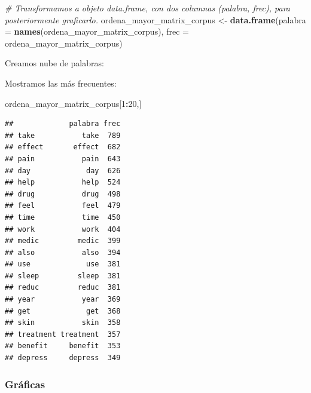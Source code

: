 \documentclass[spanish,]{article}
\newenvironment{Shaded}{\begin{snugshade}}{\end{snugshade}}
\newcommand{\KeywordTok}[1]{\textcolor[rgb]{0.13,0.29,0.53}{\textbf{#1}}}
\newcommand{\DataTypeTok}[1]{\textcolor[rgb]{0.13,0.29,0.53}{#1}}
\newcommand{\DecValTok}[1]{\textcolor[rgb]{0.00,0.00,0.81}{#1}}
\newcommand{\StringTok}[1]{\textcolor[rgb]{0.31,0.60,0.02}{#1}}
\newcommand{\CommentTok}[1]{\textcolor[rgb]{0.56,0.35,0.01}{\textit{#1}}}
\newcommand{\OperatorTok}[1]{\textcolor[rgb]{0.81,0.36,0.00}{\textbf{#1}}}
\newcommand{\NormalTok}[1]{#1}
\begin{document}
\begin{Shaded}
\begin{Highlighting}[]
\CommentTok{# Transformamos a objeto data.frame, con dos columnas (palabra, frec), para posteriormente graficarlo.}
\NormalTok{ordena_mayor_matrix_corpus <-}\StringTok{ }\KeywordTok{data.frame}\NormalTok{(}\DataTypeTok{palabra =} \KeywordTok{names}\NormalTok{(ordena_mayor_matrix_corpus), }\DataTypeTok{frec =}\NormalTok{ ordena_mayor_matrix_corpus)}
\end{Highlighting}
\end{Shaded}

Creamos nube de palabras:

\begin{Shaded}
\end{Shaded}

Mostramos las más frecuentes:

\begin{Shaded}
\begin{Highlighting}[]
\NormalTok{ordena_mayor_matrix_corpus[}\DecValTok{1}\OperatorTok{:}\DecValTok{20}\NormalTok{,]}
\end{Highlighting}
\end{Shaded}

\begin{verbatim}
##             palabra frec
## take           take  789
## effect       effect  682
## pain           pain  643
## day             day  626
## help           help  524
## drug           drug  498
## feel           feel  479
## time           time  450
## work           work  404
## medic         medic  399
## also           also  394
## use             use  381
## sleep         sleep  381
## reduc         reduc  381
## year           year  369
## get             get  368
## skin           skin  358
## treatment treatment  357
## benefit     benefit  353
## depress     depress  349
\end{verbatim}

\subsubsection{Gráficas}\label{graficas}
\end{document}
